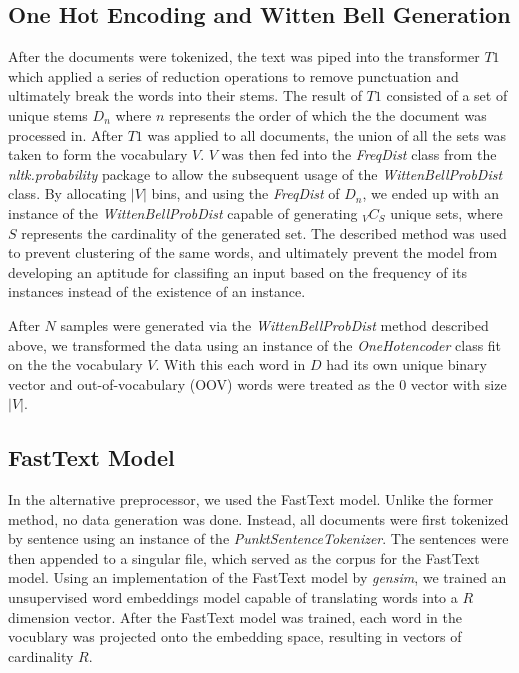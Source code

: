 \documentclass[12pt]{report}
\begin{document}
\subsection{One Hot Encoding and Witten Bell Generation}

After the documents were tokenized, the text was piped into the transformer $T1$ which applied a
series of reduction operations to remove punctuation and ultimately break the words
into their stems. The result of $T1$ consisted of a set of unique stems $D_n$
where $n$ represents the order of which the the document was processed in.
After $T1$ was applied to all documents, the union of all the sets was taken to
form the vocabulary $V$. $V$ was then fed into the \emph{FreqDist} class from
the \emph{nltk.probability} package to allow the subsequent usage of the
\emph{WittenBellProbDist} class. By allocating $|V|$ bins, and using the
\emph{FreqDist} of $D_n$, we ended up with an instance of the
\emph{WittenBellProbDist} capable of generating ${}_{V}C_{S}$ unique sets,
where $S$ represents the cardinality of the generated set. The described method
was used to prevent clustering of the same words, and ultimately prevent the
model from developing an aptitude for classifing an input based on the
frequency of its instances instead of the existence of an instance.


After $N$ samples were generated via the \emph{WittenBellProbDist} method
described above, we transformed the data using an instance of the
\emph{OneHotencoder} class fit on the the vocabulary $V$.
With this each word in $D$ had its own unique binary vector and out-of-vocabulary (OOV)
words were treated as the $0$ vector with size $|V|$.

\subsection{FastText Model}
In the alternative preprocessor, we used the FastText model. Unlike the former method,
no data generation was done. Instead, all documents were first tokenized by sentence using
an instance of the \emph{PunktSentenceTokenizer}. The sentences were then appended to
a singular file, which served as the corpus for the FastText model. Using an implementation of
the FastText model by \emph{gensim}, we trained an unsupervised word embeddings model
capable of translating words into a $R$ dimension vector.
After the FastText model was trained, each word in the vocublary was projected onto
the embedding space, resulting in vectors of cardinality $R$.
\end{document}

